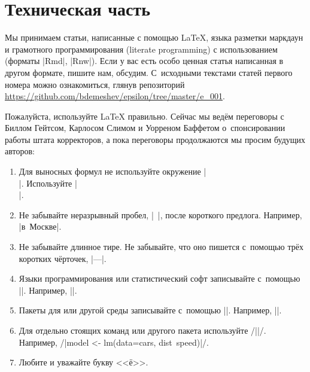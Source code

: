 \documentclass[final,pdftex]{../../template/epsilonj}
\begin{document}
\section{Техническая часть}


Мы принимаем статьи, написанные с помощью \LaTeX, языка разметки маркдаун и грамотного программирования (literate programming) с использованием  (форматы \code|Rmd|, \code|Rnw|). Если у вас есть особо ценная статья написанная в другом формате, пишите нам, обсудим. С~исходными текстами статей первого номера можно ознакомиться, глянув репозиторий \url{https://github.com/bdemeshev/epsilon/tree/master/e_001}.

Пожалуйста, используйте \LaTeX{} правильно. Сейчас мы ведём переговоры с Биллом Гейтсом, Карлосом Слимом и Уорреном Баффетом о~спонсировании работы штата корректоров, а пока переговоры продолжаются мы просим будущих авторов:

\begin{enumerate}
\item Для выносных формул не используйте окружение \code|$$ $$|. Используйте \code|\[ \]|.
\item Не забывайте неразрывный пробел, \code|~|, после короткого предлога. Например, \code|в~Москве|.
\item Не забывайте длинное тире. Не забывайте, что оно пишется с~помощью трёх коротких чёрточек, \code|---|.
\item Языки программирования или статистический софт записывайте с~помощью \code|\proglang{}|. Например, \code||.
\item Пакеты для  или другой среды записывайте с~помощью \code|\pkg{}|. Например, \code||.
\item Для отдельно стоящих команд  или другого пакета используйте \code/\code||/. Например, \code/\code|model <- lm(data=cars, dist~speed)|/.
\item Любите и уважайте букву <<ё>>.
\end{enumerate}
\end{document}
